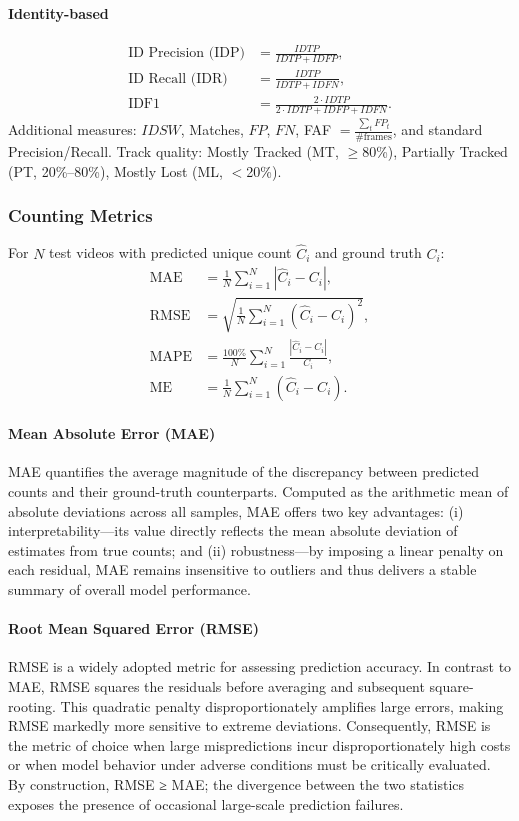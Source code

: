 \paragraph{Identity-based}
\begin{align}
\text{ID Precision (IDP)} &= \frac{IDTP}{IDTP + IDFP}, \\
\text{ID Recall (IDR)} &= \frac{IDTP}{IDTP + IDFN}, \\
\text{IDF1} &= \frac{2 \cdot IDTP}{2 \cdot IDTP + IDFP + IDFN}.
\end{align}
Additional measures: $IDSW$, Matches, $FP$, $FN$, FAF $= \frac{\sum_t FP_t}{\text{\#frames}}$, and standard Precision/Recall. Track quality: Mostly Tracked (MT, $\geq$80\%), Partially Tracked (PT, 20\%--80\%), Mostly Lost (ML, $<$20\%).

\subsubsection{Counting Metrics}
For $N$ test videos with predicted unique count $\hat{C}_i$ and ground truth $C_i$:
\begin{align}
\text{MAE} &= \frac{1}{N} \sum_{i=1}^{N} | \hat{C}_i - C_i |, \\
\text{RMSE} &= \sqrt{\frac{1}{N} \sum_{i=1}^{N} (\hat{C}_i - C_i)^2}, \\
\text{MAPE} &= \frac{100\%}{N} \sum_{i=1}^{N} \frac{|\hat{C}_i - C_i|}{C_i}, \\
\text{ME} &= \frac{1}{N} \sum_{i=1}^{N} (\hat{C}_i - C_i).
\end{align}



\paragraph{Mean Absolute Error (MAE)} MAE quantifies the average magnitude of the discrepancy between predicted counts and their ground-truth counterparts. Computed as the arithmetic mean of absolute deviations across all samples, MAE offers two key advantages: (i) interpretability—its value directly reflects the mean absolute deviation of estimates from true counts; and (ii) robustness—by imposing a linear penalty on each residual, MAE remains insensitive to outliers and thus delivers a stable summary of overall model performance.

\paragraph{Root Mean Squared Error (RMSE)} RMSE is a widely adopted metric for assessing prediction accuracy. In contrast to MAE, RMSE squares the residuals before averaging and subsequent square-rooting. This quadratic penalty disproportionately amplifies large errors, making RMSE markedly more sensitive to extreme deviations. Consequently, RMSE is the metric of choice when large mispredictions incur disproportionately high costs or when model behavior under adverse conditions must be critically evaluated. By construction, RMSE ≥ MAE; the divergence between the two statistics exposes the presence of occasional large-scale prediction failures.

